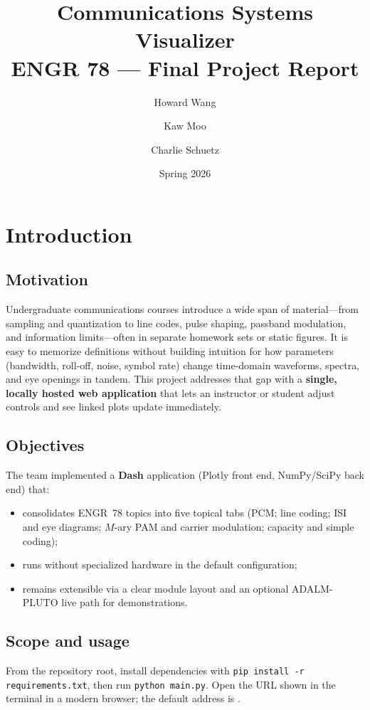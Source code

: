 \documentclass[11pt,a4paper]{article}
\title{\textbf{Communications Systems Visualizer}\\[0.3em]
\large ENGR 78 --- Final Project Report}
\author{Howard Wang \and Kaw Moo \and Charlie Schuetz}
\date{Spring 2026}
\begin{document}
\maketitle

\section{Introduction}

\subsection{Motivation}
Undergraduate communications courses introduce a wide span of material---from sampling and quantization to line codes, pulse shaping, passband modulation, and information limits---often in separate homework sets or static figures. It is easy to memorize definitions without building intuition for how parameters (bandwidth, roll-off, noise, symbol rate) change time-domain waveforms, spectra, and eye openings in tandem. This project addresses that gap with a \textbf{single, locally hosted web application} that lets an instructor or student adjust controls and see linked plots update immediately.

\subsection{Objectives}
The team implemented a \textbf{Dash} application (Plotly front end, NumPy/SciPy back end) that:
\begin{itemize}
    \item consolidates ENGR~78 topics into five topical tabs (PCM; line coding; ISI and eye diagrams; $M$-ary PAM and carrier modulation; capacity and simple coding);
    \item runs without specialized hardware in the default configuration;
    \item remains extensible via a clear module layout and an optional ADALM-PLUTO live path for demonstrations.
\end{itemize}

\subsection{Scope and usage}
From the repository root, install dependencies with \texttt{pip install -r requirements.txt}, then run \texttt{python main.py}. Open the URL shown in the terminal in a modern browser; the default address is .
\end{document}
